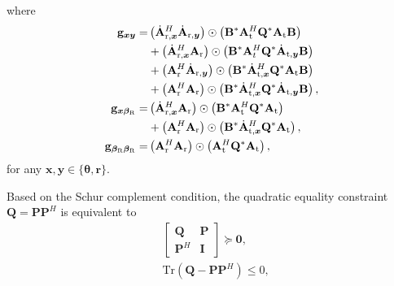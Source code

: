 \documentclass[10pt,journal,twocolumn]{IEEEtran}
\begin{document}
where
\begin{subequations}\label{partial_derivative3}
\begin{align}
\mathbf{g}_{\bm{x}\bm{y}}=&\left(\dot{\mathbf{A}}^H_{\text{r},\bm{x}}\dot{\mathbf{A}}_{\text{r},\bm{y}}\right)\odot\left(\mathbf{B}^*\mathbf{A}^H_\text{t}\mathbf{Q}^*\mathbf{A}_\text{t}\mathbf{B}\right)\notag\\
&+\left(\dot{\mathbf{A}}^H_{\text{r},\bm{x}}\mathbf{A}_{\text{r}}\right)\odot\left(\mathbf{B}^*\mathbf{A}^H_t\mathbf{Q}^*\dot{\mathbf{A}}_{\text{t},\bm{y}}\mathbf{B}\right)\notag\\
&+\left(\mathbf{A}^H_{\text{r}}\dot{\mathbf{A}}_{\text{r},\bm{y}}\right)\odot\left(\mathbf{B}^*\dot{\mathbf{A}}^H_{\text{t},\bm{x}}\mathbf{Q}^*\mathbf{A}_\text{t}\mathbf{B}\right)\notag\\
&+\left(\mathbf{A}^H_{\text{r}}\mathbf{A}_{\text{r}}\right)\odot\left(\mathbf{B}^*\dot{\mathbf{A}}^H_{\text{t},\bm{x}}\mathbf{Q}^*\dot{\mathbf{A}}_{\text{t},\bm{y}}\mathbf{B}\right),\\
\mathbf{g}_{\bm{x}\bm{\beta}_\text{R}}=&\left(\dot{\mathbf{A}}^H_{\text{r},\bm{x}}\mathbf{A}_{\text{r}}\right)\odot\left(\mathbf{B}^*\mathbf{A}^H_\text{t}\mathbf{Q}^*\mathbf{A}_{\text{t}}\right)\notag\\
&+\left(\mathbf{A}^H_{\text{r}}\mathbf{A}_{\text{r}}\right)\odot\left(\mathbf{B}^*\dot{\mathbf{A}}^H_{\text{t},\bm{x}}\mathbf{Q}^*\mathbf{A}_{\text{t}}\right),\\
\mathbf{g}_{\bm{\beta}_\text{R}\bm{\beta}_\text{R}}=&\left(\mathbf{A}^H_{\text{r}}\mathbf{A}_{\text{r}}\right)\odot\left(\mathbf{A}^H_{\text{t}}\mathbf{Q}^*\mathbf{A}_{\text{t}}\right),
\end{align}
\end{subequations}
for any $ \mathbf{x},\mathbf{y}\in\{\bm{\theta},\bm{r}\}$.

Based on the Schur complement condition, the quadratic equality constraint $\mathbf{Q}=\mathbf{P}\mathbf{P}^H$ is equivalent to  
\begin{subequations}\label{equation_constraint}
\begin{align}
&\begin{bmatrix} \mathbf{Q} & \mathbf{P} \\ \mathbf{P}^H & \mathbf{I} \end{bmatrix}\succeq\mathbf{0},\label{equation_1}\\
 &\text{Tr}\left(\mathbf{Q}-\mathbf{P}\mathbf{P}^H\right)\leq 0,\label{equation_2}
\end{align}
\end{subequations}
\end{document}

